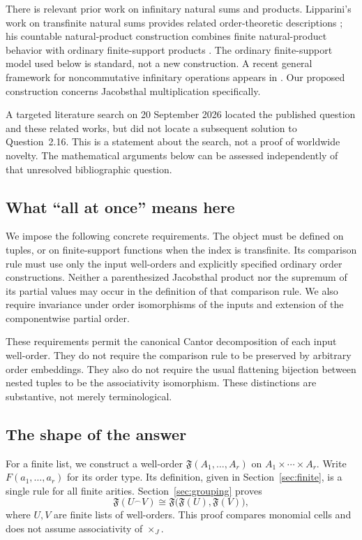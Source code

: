 \documentclass[11pt,letterpaper]{article}
\theoremstyle{definition}
\theoremstyle{remark}
\newcommand{\J}{\mathbin{\times_{\!J}}}
\newcommand{\FF}{\mathfrak F}
\newcommand{\concat}{\mathbin{{}^{\frown}}}
\begin{document}
There is relevant prior work on infinitary natural sums and products.
Lipparini's work on transfinite natural sums provides related
order-theoretic descriptions \cite{lip-sums}; his countable natural-product
construction combines finite natural-product behavior with ordinary
finite-support products \cite{lip-product}. The ordinary finite-support
model used below is standard, not a new construction. A recent general
framework for noncommutative infinitary operations appears in
\cite{lip-semigroup}. Our proposed construction concerns Jacobsthal
multiplication specifically.

A targeted literature search on 20 September 2026 located the published
question and these related works, but did not locate a subsequent solution
to Question~2.16. This is a statement about the search, not a proof of
worldwide novelty. The mathematical arguments below can be assessed
independently of that unresolved bibliographic question.

\subsection{What ``all at once'' means here}

We impose the following concrete requirements. The object must be defined
on tuples, or on finite-support functions when the index is transfinite.
Its comparison rule must use only the input well-orders and explicitly
specified ordinary order constructions. Neither a parenthesized
Jacobsthal product nor the supremum of its partial values may occur in the
definition of that comparison rule. We also require invariance under order
isomorphisms of the inputs and extension of the componentwise partial
order.

These requirements permit the canonical Cantor decomposition of each input
well-order. They do not require the comparison rule to be preserved by
arbitrary order embeddings. They also do not require the usual flattening
bijection between nested tuples to be the associativity isomorphism. These
distinctions are substantive, not merely terminological.

\subsection{The shape of the answer}

For a finite list, we construct a well-order
$\FF(A_1,\ldots,A_r)$ on $A_1\times\cdots\times A_r$.
Write $F(a_1,\ldots,a_r)$ for its order type. Its definition, given in
Section~\ref{sec:finite}, is a single rule for all finite arities.
Section~\ref{sec:grouping} proves
\begin{equation}\label{eq:intro-group}
 \FF(U\concat V)\cong \FF\bigl(\FF(U),\FF(V)\bigr),
\end{equation}
where $U,V$ are finite lists of well-orders. This proof compares monomial
cells and does not assume associativity of $\J$.
\end{document}
